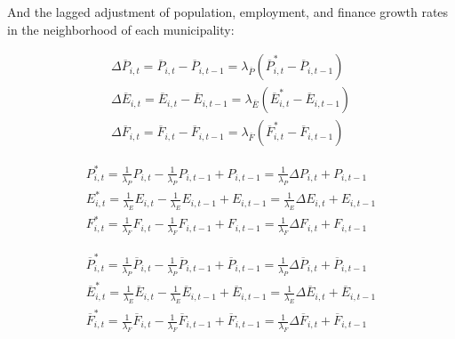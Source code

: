 \documentclass[a4paper,11pt,oneside]{article}
\begin{document}
And the lagged adjustment of population, employment, and finance growth rates in the neighborhood of each municipality:

\begin{equation}
\tag{iii}
\label{eq:equation_5}
\begin{array}{l}
\Delta \overline {P}_{i,t} = \overline{P}_{i,t} - \overline{P}_{i,t-1} = \lambda_{\overline{P}} (\overline{P}_{i,t}^* -  \overline{P}_{i,t-1}) \\
\Delta \overline {E}_{i,t} = \overline{E}_{i,t} - \overline{E}_{i,t-1} = \lambda_{\overline{E}} (\overline{E}_{i,t}^* -  \overline{E}_{i,t-1}) \\
\Delta \overline {F}_{i,t} = \overline{F}_{i,t} - \overline{F}_{i,t-1} = \lambda_{\overline{F}} (\overline{F}_{i,t}^* -  \overline{F}_{i,t-1})
\end{array}
\end{equation}

\begin{equation*}
\begin{array}{l}
P_{i,t}^* = \frac{1}{\lambda_P} P_{i,t} - \frac{1}{\lambda_P} P_{i,t-1} + P_{i,t-1} = \frac{1}{\lambda_P} \Delta P_{i,t} + P_{i,t-1} \\
E_{i,t}^* = \frac{1}{\lambda_E} E_{i,t} - \frac{1}{\lambda_E} E_{i,t-1} + E_{i,t-1} = \frac{1}{\lambda_E} \Delta E_{i,t} + E_{i,t-1} \\
F_{i,t}^* = \frac{1}{\lambda_F} F_{i,t} - \frac{1}{\lambda_F} F_{i,t-1} + F_{i,t-1} = \frac{1}{\lambda_F} \Delta F_{i,t} + F_{i,t-1}
\end{array}
\end{equation*}

\begin{equation*}
\begin{array}{l}
\overline{P}_{i,t}^* = \frac{1}{\lambda_P} \overline{P}_{i,t} - \frac{1}{\lambda_P} \overline{P}_{i,t-1} + \overline{P}_{i,t-1} = \frac{1}{\lambda_P} \Delta \overline{P}_{i,t} + \overline{P}_{i,t-1} \\
\overline{E}_{i,t}^* = \frac{1}{\lambda_E} \overline{E}_{i,t} - \frac{1}{\lambda_E} \overline{E}_{i,t-1} + \overline{E}_{i,t-1} = \frac{1}{\lambda_E} \Delta \overline{E}_{i,t} + \overline{E}_{i,t-1} \\
\overline{F}_{i,t}^* = \frac{1}{\lambda_F} \overline{F}_{i,t} - \frac{1}{\lambda_F} \overline{F}_{i,t-1} + \overline{F}_{i,t-1} = \frac{1}{\lambda_F} \Delta \overline{F}_{i,t} + \overline{F}_{i,t-1}
\end{array}
\end{equation*}
\end{document}
